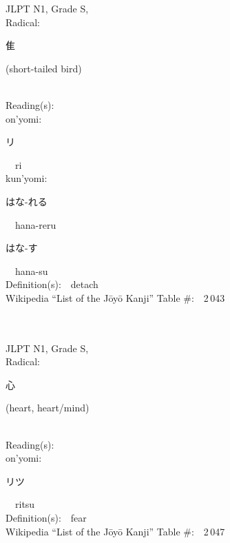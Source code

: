 \begin{multicols}{2}
{JLPT N1, Grade S, \\Radical:\ \ {\begin{CJK}{UTF8}{min} 隹 \end{CJK}} (short-tailed bird) } \\
Reading(s):\ \ \\
{\hspace*{1em}}on'yomi:\ \ \\
{\hspace*{2em}}{\begin{CJK}{UTF8}{min} リ \end{CJK}}\ \ ri\ \ \\
{\hspace*{1em}}kun'yomi:\ \ \\
{\hspace*{2em}}{\begin{CJK}{UTF8}{min} はな-れる \end{CJK}}\ \ hana-reru\ \ \\
{\hspace*{2em}}{\begin{CJK}{UTF8}{min} はな-す \end{CJK}}\ \ hana-su\ \ \\
Definition(s):\ \ detach \\
Wikipedia ``List of the J\=oy\=o Kanji'' Table \#:\ \ 2\,043 \\
\ \ \\
{\fontsize{34pt}{40pt}  }\ \ \\
{JLPT N1, Grade S, \\Radical:\ \ {\begin{CJK}{UTF8}{min} 心 \end{CJK}} (heart, heart/mind) } \\
Reading(s):\ \ \\
{\hspace*{1em}}on'yomi:\ \ \\
{\hspace*{2em}}{\begin{CJK}{UTF8}{min} リツ \end{CJK}}\ \ ritsu\ \ \\
Definition(s):\ \ fear \\
Wikipedia ``List of the J\=oy\=o Kanji'' Table \#:\ \ 2\,047 \\
\ \ \\
{\fontsize{34pt}{40pt}  }\ \ \\

\end{multicols}
